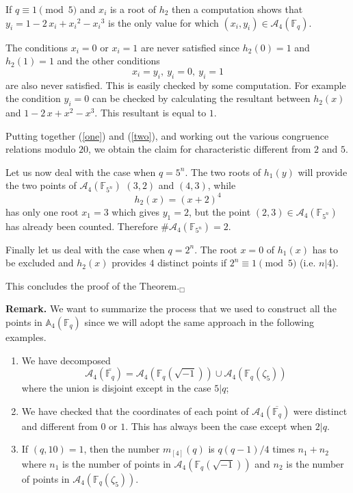 \documentclass[a4paper,twoside]{article}
\begin{document}
If $q\equiv 1\pmod 5$  and $x_i$ is a root of $h_2$ then a
computation shows that
$y_i=1-2\,x_{{i}}+{x_{{i}}}^{2}-{x_{{i}}}^{3}$ is the only value
for which $(x_i,y_i)\in\mathcal A_4(\mathbb F_q)$.

The conditions $x_i=0$ or $x_i=1$ are never satisfied since
$h_2(0)=1$ and $h_2(1)=1$ and the other conditions
$$x_i=y_i,\ y_i=0,\ y_i=1$$
are also never satisfied. This is easily checked by some
computation. For example the condition $y_i=0$ can be checked by
calculating the resultant between $h_2(x)$ and
$1-2\,x+x^{2}-x^{3}$. This resultant is equal to $1$.

Putting together (\ref{one}) and (\ref{two}), and working out the
various congruence relations modulo $20$, we obtain the claim for
characteristic different from $2$ and $5$.

Let us now deal with the case when $q=5^n$. The two roots of
$h_1(y)$ will provide the two points of $\mathcal A_4(\mathbb
F_{5^n})$ $(3,2)$ and $(4,3)$, while
$$h_2(x)=(x+2)^4$$
has only one root $x_1=3$ which gives $y_1=2$, but the point
$(2,3)\in\mathcal A_4(\mathbb F_{5^n})$ has already been counted.
Therefore $\#\mathcal A_4(\mathbb F_{5^n})=2$.

Finally let us deal with the case when $q=2^n$. The root $x=0$ of $h_1(x)$ has to be excluded and
$h_2(x)$ provides $4$ distinct points if $2^n\equiv 1\pmod 5$ (i.e. $n|4$).

This concludes the proof of the Theorem.\hfill$_\Box$\bigskip

\noindent\textbf{Remark.} We want to summarize the process that we
used to construct all the points in $\mathbb A_4(\mathbb F_q)$
since we will adopt the same approach in the following examples.
\begin{enumerate}
\item We have decomposed
$$\mathcal A_4(\overline{\mathbb F_q}) = \mathcal A_4(\mathbb F_q(\sqrt{-1}))
\cup \mathcal A_4(\mathbb F_q(\zeta_5))$$
where the union is disjoint except in the case $5|q$;
\item We have checked that the coordinates of each point of $\mathcal A_4(\overline{\mathbb F_q})$ were distinct
and different from $0$ or $1$. This has always been the case except when $2|q$.
\item If $(q,10)=1$, then the number $m_{[4]}(q)$ is $q(q-1)/4$ times $n_1+n_2$ where $n_1$ is the number
of points in $\mathcal A_4(\mathbb F_q(\sqrt{-1}))$ and $n_2$ is the number
of points in $\mathcal A_4(\mathbb F_q(\zeta_5))$.
\end{enumerate}
\end{document}
